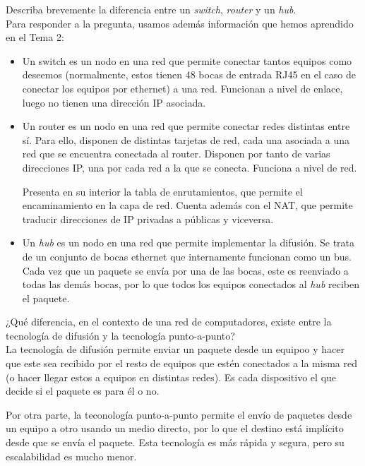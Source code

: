 \begin{ejercicio}
    Describa brevemente la diferencia entre un \textit{switch}, \textit{router} y un \textit{hub}.\\

    Para responder a la pregunta, usamos además información que hemos aprendido en el Tema 2:
    \begin{itemize}
        \item Un switch es un nodo en una red que permite conectar tantos equipos como deseemos (normalmente, estos tienen 48 bocas de entrada RJ45 en el caso de conectar los equipos por ethernet) a una red. Funcionan a nivel de enlace, luego no tienen una dirección IP asociada.
        \item Un router es un nodo en una red que permite conectar redes distintas entre sí. Para ello, disponen de distintas tarjetas de red, cada una asociada a una red que se encuentra conectada al router. Disponen por tanto de varias direcciones IP, una por cada red a la que se conecta. Funciona a nivel de red.

            Presenta en su interior la tabla de enrutamientos, que permite el encaminamiento en la capa de red. Cuenta además con el \acrshort{NAT}, que permite traducir direcciones de IP privadas a públicas y viceversa.
        \item Un \textit{hub} es un nodo en una red que permite implementar la difusión. Se trata de un conjunto de bocas ethernet que internamente funcionan como un bus. Cada vez que un paquete se envía por una de las bocas, este es reenviado a todas las demás bocas, por lo que todos los equipos conectados al \textit{hub} reciben el paquete.
    \end{itemize}
\end{ejercicio}

\begin{ejercicio}
    ¿Qué diferencia, en el contexto de una red de computadores, existe entre la tecnología de difusión y la tecnología punto-a-punto?\\

    La tecnología de difusión permite enviar un paquete desde un equipoo y hacer que este sea recibido por el resto de equipos que estén conectados a la misma red (o hacer llegar estos a equipos en distintas redes).
    Es cada dispositivo el que decide si el paquete es para él o no.

    Por otra parte, la teconología punto-a-punto permite el envío de paquetes desde un equipo a otro usando un medio directo, por lo que el destino está implícito desde que se envía el paquete.
    Esta tecnología es más rápida y segura, pero su escalabilidad es mucho menor.
\end{ejercicio}


